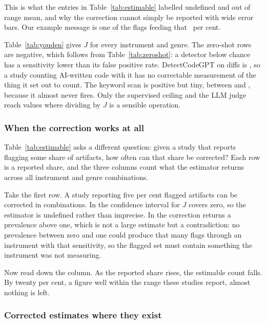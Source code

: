 This is what the entries in Table~\ref{tab:estimable} labelled undefined and out of
range mean, and why the correction cannot simply be reported with wide error bars. Our
example message is one of the flags feeding that \WorkedAp{}~per cent.

Table~\ref{tab:youden} gives $J$ for every instrument and genre. The zero-shot rows are
negative, which follows from Table~\ref{tab:zeroshot}: a detector below chance has a
sensitivity lower than its false positive rate. DetectCodeGPT on diffs is
, so a study counting AI-written code with it has no correctable
measurement of the thing it set out to count. The keyword scan is positive but tiny,
between  and , because it almost never fires. Only the
supervised ceiling and the LLM judge reach values where dividing by $J$ is a sensible
operation.

\subsubsection{When the correction works at all}
\label{sec:correction:estimable}



Table~\ref{tab:estimable} asks a different question: given a study that reports flagging
some share of artifacts, how often can that share be corrected? Each row is a reported
share, and the three columns count what the estimator returns across all
\CorrectionCells{} instrument and genre combinations.

Take the first row. A study reporting five per cent flagged artifacts can be corrected in
\CorrectionEstimable{} combinations. In \CorrectionUndefined{} the confidence interval
for $J$ covers zero, so the estimator is undefined rather than imprecise. In
\CorrectionOutOfRange{} the correction returns a prevalence above one, which is not a
large estimate but a contradiction: no prevalence between zero and one could produce
that many flags through an instrument with that sensitivity, so the flagged set must
contain something the instrument was not measuring.

Now read down the column. As the reported share rises, the estimable count falls. By
twenty per cent, a figure well within the range these studies report, almost nothing is
left.

\subsubsection{Corrected estimates where they exist}
\label{sec:correction:corrected}

